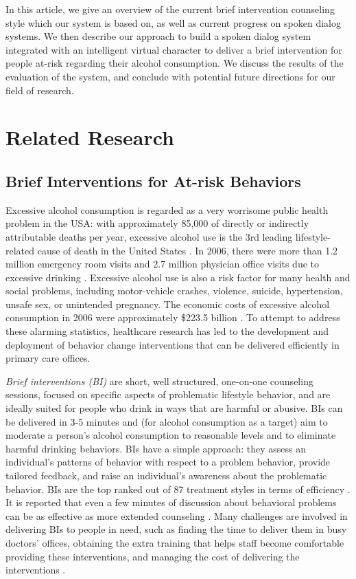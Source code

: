 \begin{sloppy}
In this article, we give an overview of the current brief intervention counseling style which our system is based on, as well as current progress on spoken dialog systems.  We then describe our approach to build a spoken dialog system integrated with an intelligent virtual character to deliver a brief intervention for people at-risk regarding their alcohol consumption.  We discuss the results of the evaluation of the system, and conclude with potential future directions for our field of research.


\section{Related Research}
\label{sec:RR}

\subsection{Brief Interventions for At-risk Behaviors}
\label{sec:BIs}

Excessive alcohol consumption is regarded as a very worrisome public health problem in the USA: with approximately 85,000 of directly or indirectly attributable deaths per year, excessive alcohol use is the 3rd leading lifestyle-related cause of death in the United States \cite{Mokdad2004Death}. In 2006, there were more than 1.2 million 
emergency room visits and 2.7 million physician office visits due to excessive drinking \cite{Bouchery2011}.  Excessive alcohol use is also a risk factor for many health and social problems, including motor-vehicle crashes, violence, suicide, hypertension, unsafe sex, or unintended pregnancy.  The economic costs of excessive alcohol consumption in 2006 were approximately \$223.5 billion \cite{Bouchery2011}.  To attempt to address these alarming statistics, healthcare research has led to the development and deployment of behavior change interventions that can be delivered efficiently in primary care offices.

{\em Brief interventions (BI)} are short, well structured, one-on-one counseling sessions, focused on specific aspects of problematic lifestyle behavior, and are ideally suited for people who drink in ways that are harmful or abusive. BIs can be delivered in 3-5 minutes \cite{Moyer2002} and (for alcohol consumption as a target) aim to moderate a person's alcohol consumption to reasonable levels and to eliminate harmful drinking behaviors. BIs have a  simple approach: they assess an individual's patterns of behavior with respect to a problem behavior, provide tailored feedback, and raise an individual's awareness about the problematic behavior.  BIs are the top ranked out of 87 treatment styles in terms of efficiency \cite{miller2002mesa}. It is reported that even a few minutes of discussion about behavioral problems can be as  effective as more extended counseling \cite{babor1992}.  Many challenges are involved in delivering BIs to people in need, such as finding the time to deliver them in busy doctors' offices, obtaining the extra training that helps staff become comfortable providing these interventions, and managing the cost of delivering the interventions \cite{national2006niaaa}. 


\end{sloppy}
